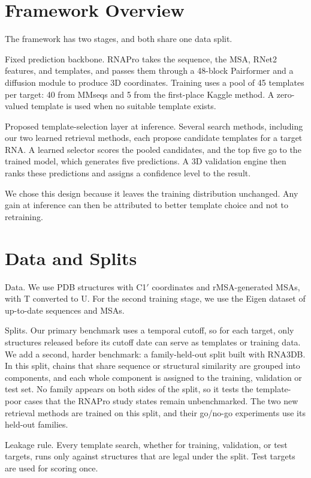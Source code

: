 \documentclass{FastFyp}
\begin{document}
\section{Framework Overview}
The framework has two stages, and both share one data split.

Fixed prediction backbone. RNAPro takes the sequence, the MSA, RNet2 features, and templates, and passes them through a 48-block Pairformer and a diffusion module to produce 3D coordinates. Training uses a pool of 45 templates per target: 40 from MMseqs and 5 from the first-place Kaggle method. A zero-valued template is used when no suitable template exists.

Proposed template-selection layer at inference. Several search methods, including our two learned retrieval methods, each propose candidate templates for a target RNA. A learned selector scores the pooled candidates, and the top five go to the trained model, which generates five predictions. A 3D validation engine then ranks these predictions and assigns a confidence level to the result.

We chose this design because it leaves the training distribution unchanged. Any gain at inference can then be attributed to better template choice and not to retraining.

\section{Data and Splits}
Data. We use PDB structures with C1$'$ coordinates and rMSA-generated MSAs, with T converted to U. For the second training stage, we use the Eigen dataset of up-to-date sequences and MSAs.

Splits. Our primary benchmark uses a temporal cutoff, so for each target, only structures released before its cutoff date can serve as templates or training data. We add a second, harder benchmark: a family-held-out split built with RNA3DB. In this split, chains that share sequence or structural similarity are grouped into components, and each whole component is assigned to the training, validation or test set. No family appears on both sides of the split, so it tests the template-poor cases that the RNAPro study states remain unbenchmarked. The two new retrieval methods are trained on this split, and their go/no-go experiments use its held-out families.

Leakage rule. Every template search, whether for training, validation, or test targets, runs only against structures that are legal under the split. Test targets are used for scoring once.
\end{document}
